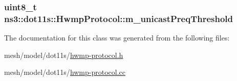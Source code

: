 \subsubsection[{\texorpdfstring{m\+\_\+unicast\+Preq\+Threshold}{m_unicastPreqThreshold}}]{\setlength{\rightskip}{0pt plus 5cm}uint8\+\_\+t ns3\+::dot11s\+::\+Hwmp\+Protocol\+::m\+\_\+unicast\+Preq\+Threshold\hspace{0.3cm}{\ttfamily [private]}}\hypertarget{classns3_1_1dot11s_1_1HwmpProtocol_a3461bf4ea09ad4241bf000d499e46e02}{}\label{classns3_1_1dot11s_1_1HwmpProtocol_a3461bf4ea09ad4241bf000d499e46e02}


The documentation for this class was generated from the following files\+:\begin{DoxyCompactItemize}
\item 
mesh/model/dot11s/\hyperlink{hwmp-protocol_8h}{hwmp-\/protocol.\+h}\item 
mesh/model/dot11s/\hyperlink{hwmp-protocol_8cc}{hwmp-\/protocol.\+cc}\end{DoxyCompactItemize}
